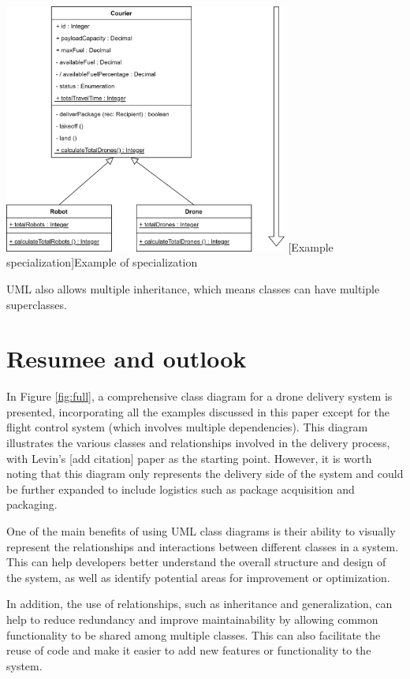 \documentclass[
	12pt,
    a4paper,
    egregdoesnotlikesansseriftitles, %
    toc=chapterentrywithdots,
    oneside, openany,
    titlepage,
    parskip=half,
    headings=normal,  %
    listof=totoc,
    bibliography=totocnumbered,
    index=totoc,
    captions=tableheading,  %
    listof=flat,
    numbers=noenddot, %
    final]
    {scrbook}
\begin{document}
\vspace{1em}
\begin{minipage}{\linewidth}
	\centering
	\includegraphics[width=0.7\textwidth]{figures/inheritance/specialization.jpg}
	[Example specialization]{Example of specialization}
	\label{fig:specialization}
\end{minipage}

UML also allows multiple inheritance, which means classes can have multiple superclasses. \cite[p. 71] {seidl2015uml}

\chapter{Resumee and outlook}


In Figure \ref{fig:full}, a comprehensive class diagram for a drone delivery system is presented, incorporating all the examples discussed in this paper except for the flight control system (which involves multiple dependencies). 
This diagram illustrates the various classes and relationships involved in the delivery process, with Levin's [add citation] paper as the starting point. 
However, it is worth noting that this diagram only represents the delivery side of the system and could be further expanded to include logistics such as package acquisition and packaging.

One of the main benefits of using UML class diagrams is their ability to visually represent the relationships and interactions between different classes in a system. 
This can help developers better understand the overall structure and design of the system, as well as identify potential areas for improvement or optimization.

In addition, the use of relationships, such as inheritance and generalization, can help to reduce redundancy and improve maintainability by allowing common functionality to be shared among multiple classes. This can also facilitate the reuse of code and make it easier to add new features or functionality to the system.
\end{document}
